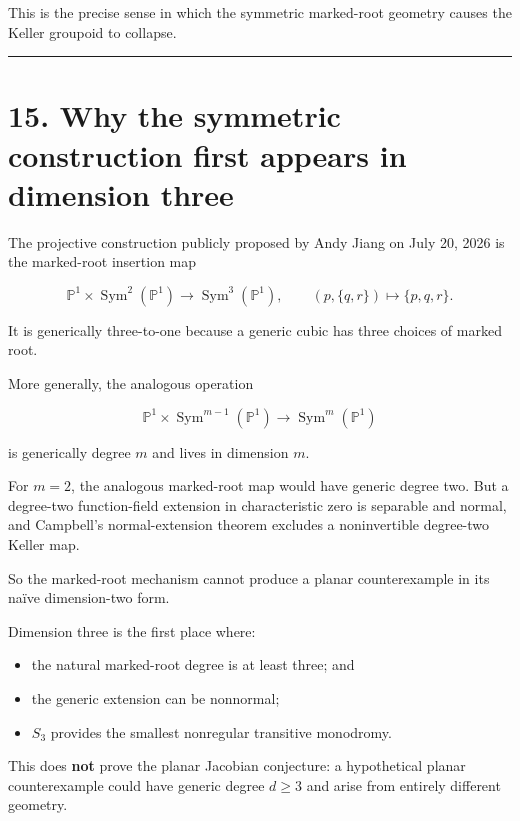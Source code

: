 This is the precise sense in which the symmetric marked-root geometry
causes the Keller groupoid to collapse.

\begin{center}\rule{0.5\linewidth}{0.5pt}\end{center}

\section{15. Why the symmetric construction first appears in dimension
three}\label{why-the-symmetric-construction-first-appears-in-dimension-three}

The projective construction publicly proposed by Andy Jiang on July 20,
2026 is the marked-root insertion map

\[
\mathbb P^1\times\operatorname{Sym}^2(\mathbb P^1)
\longrightarrow
\operatorname{Sym}^3(\mathbb P^1),
\qquad
(p,\{q,r\})\mapsto\{p,q,r\}.
\]

It is generically three-to-one because a generic cubic has three choices
of marked root.

More generally, the analogous operation

\[
\mathbb P^1\times\operatorname{Sym}^{m-1}(\mathbb P^1)
\to
\operatorname{Sym}^m(\mathbb P^1)
\]

is generically degree \(m\) and lives in dimension \(m\).

For \(m=2\), the analogous marked-root map would have generic degree
two. But a degree-two function-field extension in characteristic zero is
separable and normal, and Campbell's normal-extension theorem excludes a
noninvertible degree-two Keller map.

So the marked-root mechanism cannot produce a planar counterexample in
its naïve dimension-two form.

Dimension three is the first place where:

\begin{itemize}
\tightlist
\item
  the natural marked-root degree is at least three; and
\item
  the generic extension can be nonnormal;
\item
  \(S_3\) provides the smallest nonregular transitive monodromy.
\end{itemize}

This does \textbf{not} prove the planar Jacobian conjecture: a
hypothetical planar counterexample could have generic degree \(d\ge3\)
and arise from entirely different geometry.

